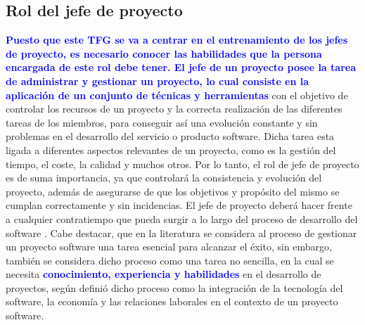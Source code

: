 \subsection{Rol del jefe de proyecto}
\label{sec:ImportanciaJP}

\textbf{\textcolor{blue}{Puesto que este TFG se va a centrar en el entrenamiento de los jefes de proyecto, es necesario conocer las habilidades que la persona encargada de este rol debe tener. El jefe de un proyecto posee la tarea de administrar y gestionar un proyecto, lo cual consiste en la aplicación de un conjunto de técnicas y herramientas}} con el objetivo de controlar los recursos de un proyecto y la correcta realización de las diferentes tareas de los miembros, para conseguir así una evolución constante y sin problemas en el desarrollo del servicio o producto software. Dicha tarea esta ligada a diferentes aspectos relevantes de un proyecto, como es la gestión del tiempo, el coste, la calidad y muchos otros. Por lo tanto, el rol de jefe de proyecto es de suma importancia, ya que controlará la consistencia y evolución del proyecto, además de asegurarse de que los objetivos y propósito del mismo se cumplan correctamente y sin incidencias. El jefe de proyecto deberá hacer frente a cualquier contratiempo que pueda surgir a lo largo del proceso de desarrollo del software \cite{colomo2014project}. Cabe destacar, que en la literatura se considera al proceso de gestionar un proyecto software una tarea esencial para alcanzar el éxito, sin embargo, también se considera dicho proceso como una tarea no sencilla, en la cual se necesita \textbf{\textcolor{blue}{conocimiento, experiencia y habilidades}} en el desarrollo de proyectos, según \cite{boehm1989theory} definió dicho proceso como la integración de la tecnología del software, la economía y las relaciones laborales en el contexto de un proyecto software. 

